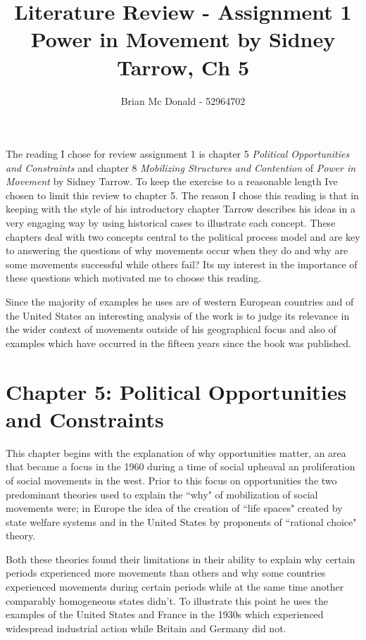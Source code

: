 \documentclass[12pt, a4paper]{article}
\title{Literature Review - Assignment 1 \\Power in Movement by Sidney Tarrow, Ch 5}
\author{Brian Mc Donald - 52964702}
\begin{document}
\maketitle

\noindent The reading I chose for review assignment 1 is chapter 5 \emph{Political Opportunities and Constraints} and chapter 8 \emph{Mobilizing Structures and Contention} of \emph{Power in Movement} by Sidney Tarrow. To keep the exercise to a reasonable length Ive chosen to limit this review to chapter 5. The reason I chose this reading is that in keeping with the style of his introductory chapter Tarrow describes his ideas in a very engaging way by using historical cases to illustrate each concept. These chapters deal with two concepts central to the political process model and are key to answering the questions of why movements occur when they do and why are some movements successful while others fail? Its my interest in the importance of these questions which motivated me to choose this reading. 

Since the majority of examples he uses are of western European countries and of the United States an interesting analysis of the work is to judge its relevance in the wider context of movements outside of his geographical focus and also of examples which have occurred in the fifteen years since the book was published.
\section*{Chapter 5: Political Opportunities and Constraints}
This chapter begins with the explanation of why opportunities matter, an area that became a focus in the 1960 during a time of social upheaval an proliferation of social movements in the west. Prior to this focus on opportunities the two predominant theories used to explain the ``why" of mobilization of social movements were; in Europe the idea of the creation of ``life spaces" created by state welfare systems and in the United States by proponents of ``rational choice" theory. 

Both these theories found their limitations in their ability to explain why certain periods experienced more movements than others and why some countries experienced movements during certain periods while at the same time another comparably homogeneous states didn't. To illustrate this point he uses the examples of the United States and France in the 1930s which experienced widespread industrial action while Britain and Germany did not.
\end{document}
